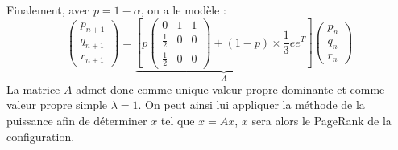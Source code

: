 \documentclass[a4paper,10pt]{report}
\begin{document}
Finalement, avec $p=1-\alpha$, on a le modèle :
\begin{equation}
\left( \begin{array}{c} p_{n+1} \\ q_{n+1} \\ r_{n+1} \end{array} \right)
= \underbrace{\left[p \left( \begin{array}{ccc} 0 & 1 & 1 \\ \frac{1}{2} & 0 & 0 \\ \frac{1}{2} & 0 & 0 \end{array} \right)
+ (1-p)\times \frac{1}{3}ee^T \right]}_A
\left( \begin{array}{c} p_{n} \\ q_{n} \\ r_{n} \end{array} \right)
\label{modele}
\end{equation}
La matrice $A$ admet donc comme unique valeur propre dominante et comme valeur propre simple $\lambda=1$. On peut ainsi lui appliquer la méthode de la puissance afin de déterminer $x$ tel que $x=Ax$, $x$ sera alors le PageRank de la configuration.\\ \\
\end{document}
